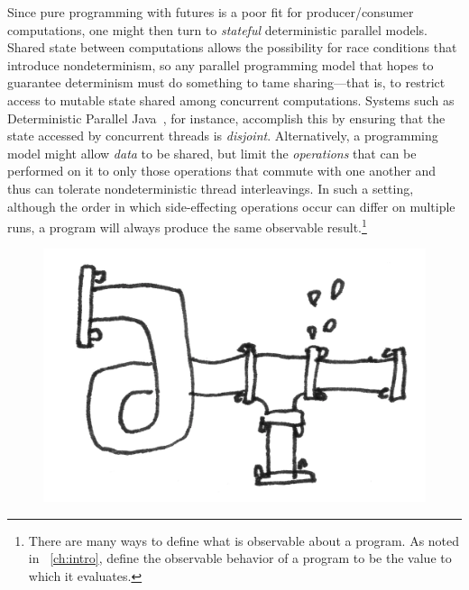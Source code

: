 Since pure programming with futures is a poor fit for
producer/consumer computations, one might then turn to \emph{stateful}
deterministic parallel models.  Shared state between computations
allows the possibility for race conditions that introduce
nondeterminism, so any parallel programming model that hopes to
guarantee determinism must do something to tame sharing---that is, to
restrict access to mutable state shared among concurrent computations.
Systems such as Deterministic Parallel Java~\cite{dpj-oopsla,
  dpj-hotpar09}, for instance, accomplish this by ensuring that the
state accessed by concurrent threads is \emph{disjoint}.
Alternatively, a programming model might allow \emph{data} to be
shared, but limit the \emph{operations} that can be performed on it to
only those operations that commute with one another and thus can
tolerate nondeterministic thread interleavings.  In such a setting,
although the order in which side-effecting operations occur can differ
on multiple runs, a program will always produce the same observable
result.\footnote{There are many ways to define what is observable
  about a program. As noted in ~\ref{ch:intro},  define the
  observable behavior of a program to be the value to which it
  evaluates.}

\ifdefined\DISSERTATION
\begin{figure}
\vspace{-1em}
\begin{center}
  \includegraphics[scale=0.15]{../illustrations/flow3}
\end{center}
\vspace{-1em}
\end{figure}
\fi

